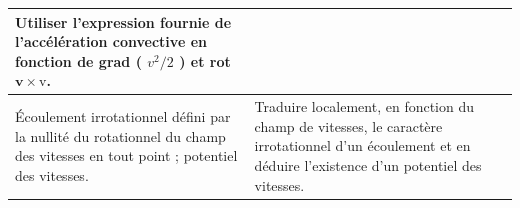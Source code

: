 {\begin{minipage}[t]{0.49\textwidth}
\begin{tabularx}{\linewidth}{|p{}|X|}
        Utiliser l'expression fournie de l'accélération convective en fonction de grad ( $v^2 / 2$ ) et rot $\mathbf{v} \times \mathrm{v}$. \\
        \hline
        Écoulement irrotationnel défini par la nullité du rotationnel du champ des vitesses en tout point ; potentiel des vitesses. & Traduire localement, en fonction du champ de vitesses, le caractère irrotationnel d'un écoulement et en déduire l'existence d'un potentiel des vitesses. \\
        \hline
    \end{tabularx}
\end{minipage}
}
